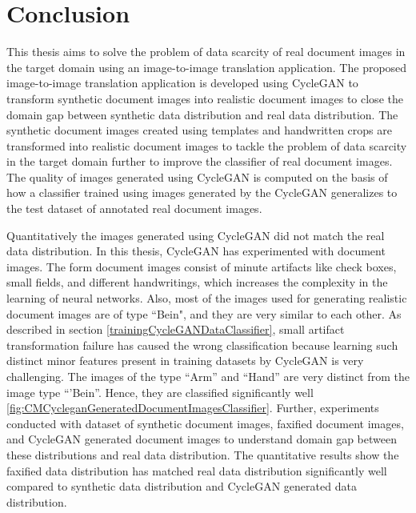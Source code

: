 \section{Conclusion}\label{Conclusion}

This thesis aims to solve the problem of data scarcity of real document images in the target domain using an image-to-image translation application. The proposed image-to-image translation application is developed using \ac{CycleGAN} to transform synthetic document images into realistic document images to close the domain gap between synthetic data distribution and real data distribution. The synthetic document images created using templates and handwritten crops are transformed into realistic document images to tackle the problem of data scarcity in the target domain further to improve the classifier of real document images. The quality of images generated using \ac{CycleGAN} is computed on the basis of how a classifier trained using images generated by the \ac{CycleGAN} generalizes to the test dataset of annotated real document images. 

Quantitatively the images generated using \ac{CycleGAN} did not match the real data distribution. In this thesis, \ac{CycleGAN} has experimented with document images. The form document images consist of minute artifacts like check boxes, small fields, and different handwritings, which increases the complexity in the learning of neural networks. Also, most of the images used for generating realistic document images are of type ``Bein", and they are very similar to each other. As described in section \ref{trainingCycleGANDataClassifier}, small artifact transformation failure has caused the wrong classification because learning such distinct minor features present in training datasets by \ac{CycleGAN} is very challenging. The images of the type ``Arm'' and ``Hand'' are very distinct from the image type ``'Bein''. Hence, they are classified significantly well \ref{fig:CMCycleganGeneratedDocumentImagesClassifier}. Further, experiments conducted with dataset of synthetic document images, faxified document images, and \ac{CycleGAN} generated document images to understand domain gap between these distributions and real data distribution. The quantitative results show the faxified data distribution has matched real data distribution significantly well compared to synthetic data distribution and \ac{CycleGAN} generated data distribution. 


